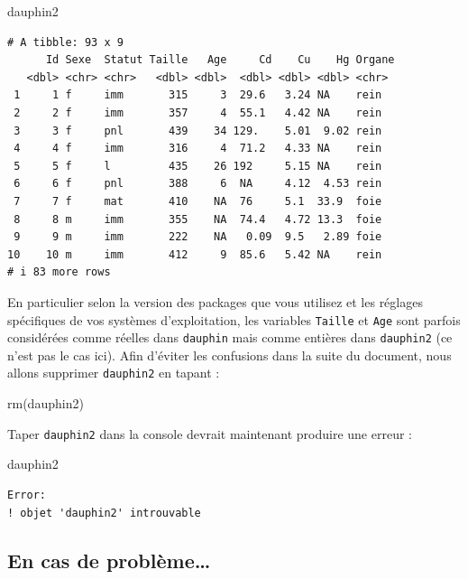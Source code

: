 \documentclass[
  a4paper,
  DIV=11,
  numbers=noendperiod,
  oneside]{scrreprt}
\newenvironment{Shaded}{}{}
\newcommand{\FunctionTok}[1]{\textcolor[rgb]{0.44,0.26,0.76}{#1}}
\newcommand{\NormalTok}[1]{\textcolor[rgb]{0.14,0.16,0.18}{#1}}
\begin{document}
\begin{Shaded}
\begin{Highlighting}[]
\NormalTok{dauphin2}
\end{Highlighting}
\end{Shaded}

\begin{verbatim}
# A tibble: 93 x 9
      Id Sexe  Statut Taille   Age     Cd    Cu    Hg Organe
   <dbl> <chr> <chr>   <dbl> <dbl>  <dbl> <dbl> <dbl> <chr> 
 1     1 f     imm       315     3  29.6   3.24 NA    rein  
 2     2 f     imm       357     4  55.1   4.42 NA    rein  
 3     3 f     pnl       439    34 129.    5.01  9.02 rein  
 4     4 f     imm       316     4  71.2   4.33 NA    rein  
 5     5 f     l         435    26 192     5.15 NA    rein  
 6     6 f     pnl       388     6  NA     4.12  4.53 rein  
 7     7 f     mat       410    NA  76     5.1  33.9  foie  
 8     8 m     imm       355    NA  74.4   4.72 13.3  foie  
 9     9 m     imm       222    NA   0.09  9.5   2.89 foie  
10    10 m     imm       412     9  85.6   5.42 NA    rein  
# i 83 more rows
\end{verbatim}

En particulier selon la version des packages que vous utilisez et les
réglages spécifiques de vos systèmes d'exploitation, les variables
\texttt{Taille} et \texttt{Age} sont parfois considérées comme réelles
dans \texttt{dauphin} mais comme entières dans \texttt{dauphin2} (ce
n'est pas le cas ici). Afin d'éviter les confusions dans la suite du
document, nous allons supprimer \texttt{dauphin2} en tapant :

\begin{Shaded}
\begin{Highlighting}[]
\FunctionTok{rm}\NormalTok{(dauphin2)}
\end{Highlighting}
\end{Shaded}

Taper \texttt{dauphin2} dans la console devrait maintenant produire une
erreur :

\begin{Shaded}
\begin{Highlighting}[]
\NormalTok{dauphin2}
\end{Highlighting}
\end{Shaded}

\begin{verbatim}
Error:
! objet 'dauphin2' introuvable
\end{verbatim}

\subsection{En cas de problème\ldots{}}\label{importproblem}
\end{document}
